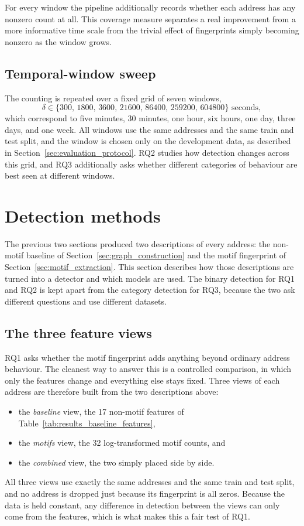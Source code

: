 \documentclass{thesisclass}
\begin{document}
For every window the pipeline additionally records whether each address has any
nonzero count at all. This coverage measure separates a real improvement from a
more informative time scale from the trivial effect of fingerprints simply
becoming nonzero as the window grows.

\subsection{Temporal-window sweep}

The counting is repeated over a fixed grid of seven windows,
\[
    \delta \in \{300,\,1800,\,3600,\,21600,\,86400,\,259200,\,604800\}
    \text{ seconds},
\]
which correspond to five minutes, 30 minutes, one hour, six hours, one day, three
days, and one week. All windows use the same addresses and the same train and
test split, and the window is chosen only on the development data, as described
in Section~\ref{sec:evaluation_protocol}. RQ2 studies how detection changes
across this grid, and RQ3 additionally asks whether different categories of
behaviour are best seen at different windows.

\section{Detection methods}
\label{sec:detection_methods}

The previous two sections produced two descriptions of every address: the
non-motif baseline of Section~\ref{sec:graph_construction} and the motif
fingerprint of Section~\ref{sec:motif_extraction}. This section describes how
those descriptions are turned into a detector and which models are used. The
binary detection for RQ1 and RQ2 is kept apart from the category detection for
RQ3, because the two ask different questions and use different datasets.

\subsection{The three feature views}

RQ1 asks whether the motif fingerprint adds anything beyond ordinary address
behaviour. The cleanest way to answer this is a controlled comparison, in which
only the features change and everything else stays fixed. Three views of each
address are therefore built from the two descriptions above:
\begin{itemize}
  \item the \emph{baseline} view, the 17 non-motif features of
        Table~\ref{tab:results_baseline_features},
  \item the \emph{motifs} view, the 32 log-transformed motif counts, and
  \item the \emph{combined} view, the two simply placed side by side.
\end{itemize}
All three views use exactly the same addresses and the same train and test split,
and no address is dropped just because its fingerprint is all zeros. Because the data is
held constant, any difference in detection between the views can only come from
the features, which is what makes this a fair test of RQ1.
\end{document}

